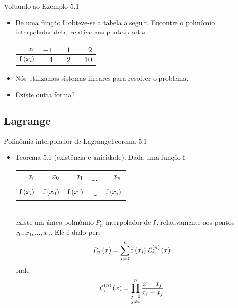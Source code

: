 \begin{frame}{Voltando ao Exemplo 5.1}
\begin{itemize}
  \item De uma função $\mathrm{f}$ obteve-se a tabela  a seguir. Encontre o polinômio interpolador dela, relativo aos pontos dados.\\
\begin{tabular}{r|rrr}
$x_i$ & $-1$ & $1$ & $2$\\
\hline
$\mathrm{f}\left(x_i\right)$ & $-4$ & $-2$ & $-10$
\end{tabular}
  \item Nós utilizamos sistemas lineares para resolver o problema.
  \item Existe outra forma?
\end{itemize}
\end{frame}

\subsection{Lagrange}

\begin{frame}{Polinômio interpolador de Lagrange}{Teorema 5.1}
\begin{itemize}
  \item Teorema 5.1 (existência e unicidade). Dada uma função $\mathrm{f}$\\
%
\begin{tabular}{r|rrrr}
\bfseries $x_i$ & \hspace{0.3cm} $x_0$ & \hspace{0.3cm} $x_1$ & \hspace{0.3cm} \ldots & \hspace{0.3cm} $x_n$ \\
\hline
\bfseries $\mathrm{f}\left(x_i\right)$ & $\mathrm{f}\left(x_0\right)$ & $\mathrm{f}\left(x_1\right)$ & \ldots & $\mathrm{f}\left(x_i\right)$ 
\end{tabular}\\
%
existe um único polinômio $P_n$ interpolador de $\mathrm{f}$, relativamente aos pontos $x_0, x_1, \ldots, x_n$. Ele é dado por:
%
\[
P_n\left(x\right) = \sum_{i=0}^{n} \mathrm{f} \left(x_i\right) \mathcal{L}_{i}^{\left(n\right)}\left(x\right)
\]
%
onde 
\[
\mathcal{L}_{i}^{\left(n\right)}\left(x\right) = \prod_{\substack{j=0\\j\ne i}}^{n} \frac{x - x_j}{x_i - x_j}
\]
\end{itemize}
\end{frame}

